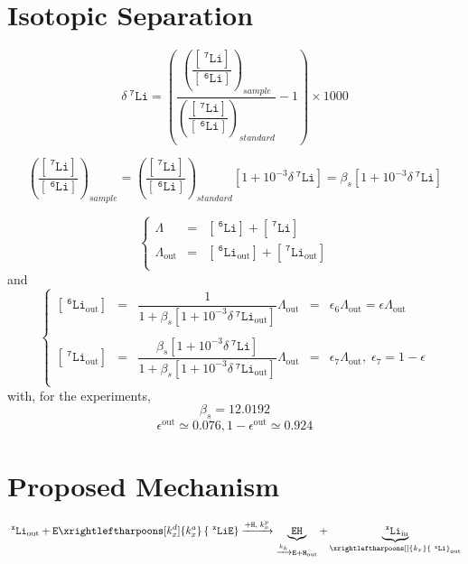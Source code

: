 \documentclass[aps,onecolumn,12pt]{revtex4}
\newcommand{\mychem}[1]{\mathtt{#1}}
\newcommand{\myconc}[1]{\left\lbrack{#1}\right\rbrack}
\newcommand{\spLi}[1]{{~^{\mychem{#1}}\mychem{Li}}}
\newcommand{\Li}[1]{\myconc{\spLi{#1}}}
\newcommand{\spEout}{\mychem{E}}
\newcommand{\spLiE}[1]{\left\lbrace\spLi{#1}\spEout\right\rbrace}
\newcommand{\spLiIn}[1]{{\spLi{#1}}_{\mathrm{in}}}
\newcommand{\spLiOut}[1]{{\spLi{#1}}_{\mathrm{out}}}
\newcommand{\LiOut}[1]{\myconc{\spLiOut{#1}}}
\newcommand{\spEHin}{\mychem{EH}}
\newcommand{\deltaLi}{ {\delta\!\!\!\spLi{7}} }
\newcommand{\deltaLiOut}{{\deltaLi}_{\mathrm{out}}}
\newcommand{\LiAll}{\Lambda}
\newcommand{\LiAllOut}{{\LiAll}_{\mathrm{out}}}
\begin{document}

\section{Isotopic Separation}
$$
	\deltaLi = \left(
		\dfrac{\left(\dfrac{\Li{7}}{\Li{6}}\right)_{sample}}
		{\left(\dfrac{\Li{7}}{\Li{6}}\right)_{standard}}
		 -1 
	\right) \times 1000
$$

$$
	\left(\dfrac{\Li{7}}{\Li{6}}\right)_{sample} = \left(\dfrac{\Li{7}}{\Li{6}}\right)_{standard} \left[1+10^{-3}\deltaLi\right] = \beta_s \left[1+10^{-3}\deltaLi\right]
$$

\begin{equation}
\left\lbrace
\begin{array}{rcl}
	\LiAll    & = & \Li{6} + \Li{7}\\
	\LiAllOut & = & \LiOut{6} + \LiOut{7}\\
\end{array}
\right.
\end{equation}
and
\begin{equation}
\left\lbrace
\begin{array}{rclcl}
	\LiOut{6} & = & \dfrac{1}{1+\beta_s \left[1+10^{-3}\deltaLiOut\right] } \LiAllOut & = & \epsilon_6 \LiAllOut  = \epsilon \LiAllOut \\
	\\
	\LiOut{7} & = & \dfrac{\beta_s \left[1+10^{-3}\deltaLi\right]}{1+\beta_s \left[1+10^{-3}\deltaLiOut\right] } \LiAllOut & = & \epsilon_7 \LiAllOut,\;\epsilon_7 = 1-\epsilon \\
\end{array}
\right.
\end{equation}
with, for the experiments,
\begin{equation}
	\beta_s = 12.0192
\end{equation}
\begin{equation}
	\epsilon^\mathrm{out} \simeq 0.076, 1-\epsilon^\mathrm{out} \simeq 0.924
\end{equation}

\section{Proposed Mechanism}

\begin{equation}
	 \spLiOut{x} +  \spEout  
	 \xrightleftharpoons[k_x^d]{k_x^a} 
	 \spLiE{x}
	  \xrightarrow[]{\mychem{+H},\;k_x^p} 
	  \underbrace{\spEHin}_{\xrightarrow[]{k_h} \mychem{E} + \mychem{H}_{\mathrm{out}}} + \underbrace{\spLiIn{x}}_{\xrightleftharpoons[]{k_x} \spLiOut{x}}
\end{equation}
\end{document}
